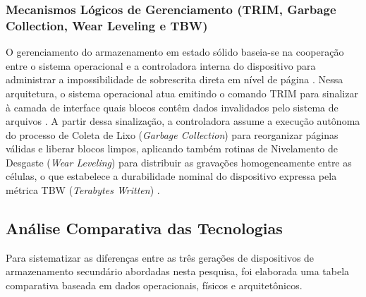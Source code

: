 \documentclass[12pt]{article}
\begin{document}
\subsubsection{Mecanismos Lógicos de Gerenciamento (TRIM, Garbage Collection, Wear Leveling e TBW)} 

O gerenciamento do armazenamento em estado sólido baseia-se na cooperação entre o sistema operacional e a controladora interna do dispositivo para administrar a impossibilidade de sobrescrita direta em nível de página \cite{ribeiro2017, santos2014}. Nessa arquitetura, o sistema operacional atua emitindo o comando TRIM para sinalizar à camada de interface quais blocos contêm dados invalidados pelo sistema de arquivos \cite{ribeiro2017, stallings2017}. A partir dessa sinalização, a controladora assume a execução autônoma do processo de Coleta de Lixo (\textit{Garbage Collection}) para reorganizar páginas válidas e liberar blocos limpos, aplicando também rotinas de Nivelamento de Desgaste (\textit{Wear Leveling}) para distribuir as gravações homogeneamente entre as células, o que estabelece a durabilidade nominal do dispositivo expressa pela métrica TBW (\textit{Terabytes Written}) \cite{santos2014, stallings2017}.

\subsection{Análise Comparativa das Tecnologias}
Para sistematizar as diferenças entre as três gerações de dispositivos de armazenamento secundário abordadas nesta pesquisa, foi elaborada uma tabela comparativa baseada em dados operacionais, físicos e arquitetônicos. 
\end{document}
